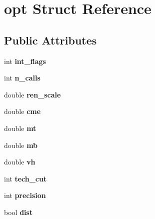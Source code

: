 \hypertarget{structopt}{\section{opt Struct Reference}
\label{structopt}
}
\subsection*{Public Attributes}
\begin{DoxyCompactItemize}
\item 
\hypertarget{structopt_acc52d812132128f6088537b4e7e07be6}{int {\bfseries int\-\_\-flags}}\label{structopt_acc52d812132128f6088537b4e7e07be6}

\item 
\hypertarget{structopt_a6ddc969cea0f437ecea3bb299d14f69d}{int {\bfseries n\-\_\-calls}}\label{structopt_a6ddc969cea0f437ecea3bb299d14f69d}

\item 
\hypertarget{structopt_a076fcc87cf2c8ce62c9504c304015d45}{double {\bfseries ren\-\_\-scale}}\label{structopt_a076fcc87cf2c8ce62c9504c304015d45}

\item 
\hypertarget{structopt_a8f98480b8d9fd189e551b50bf7b0e87d}{double {\bfseries cme}}\label{structopt_a8f98480b8d9fd189e551b50bf7b0e87d}

\item 
\hypertarget{structopt_a17c18467f0aef580d814ffa6b0836ab7}{double {\bfseries mt}}\label{structopt_a17c18467f0aef580d814ffa6b0836ab7}

\item 
\hypertarget{structopt_aafc6d245f706da1a6e3d28c01a48df40}{double {\bfseries mb}}\label{structopt_aafc6d245f706da1a6e3d28c01a48df40}

\item 
\hypertarget{structopt_a284de58961f7c639383a54335ab42bbe}{double {\bfseries vh}}\label{structopt_a284de58961f7c639383a54335ab42bbe}

\item 
\hypertarget{structopt_aced2f60b766a42008f9da934cef2f540}{int {\bfseries tech\-\_\-cut}}\label{structopt_aced2f60b766a42008f9da934cef2f540}

\item 
\hypertarget{structopt_ad36cc92ecbf8b2bc1deabde5268e9267}{int {\bfseries precision}}\label{structopt_ad36cc92ecbf8b2bc1deabde5268e9267}

\item 
\hypertarget{structopt_acd1b95ec5257a323cd3eb454c7ccd885}{bool {\bfseries dist}}\label{structopt_acd1b95ec5257a323cd3eb454c7ccd885}


\end{DoxyCompactItemize}
